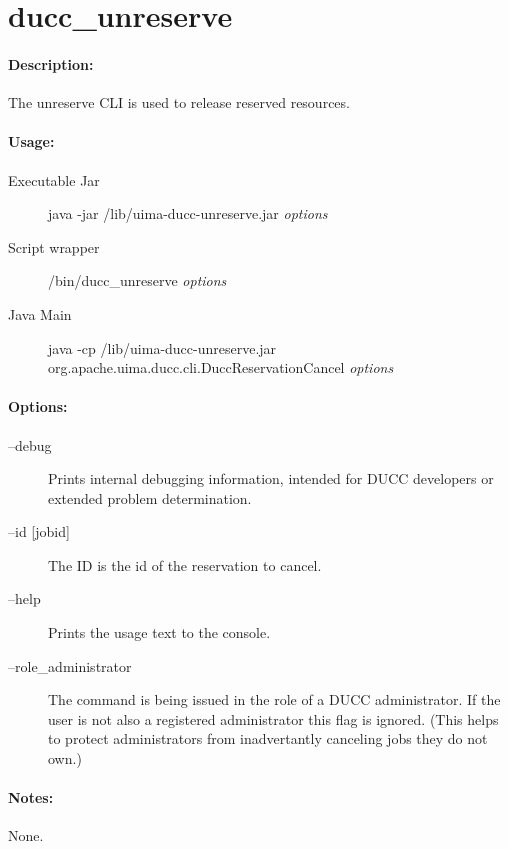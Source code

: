 \ifpdf
\else
{}
\fi
    \section{ducc\_unreserve}
    \label{sec:cli.unreserve}

    \paragraph{Description:}
    The unreserve CLI is used to release reserved resources. 

    \paragraph{Usage:}
    \begin{description}
    \item[Executable Jar] java -jar \ducchome/lib/uima-ducc-unreserve.jar {\em options}
    \item[Script wrapper] \ducchome/bin/ducc\_unreserve {\em options}
    \item[Java Main]      java -cp \ducchome/lib/uima-ducc-unreserve.jar org.apache.uima.ducc.cli.DuccReservationCancel {\em options}
    \end{description}

    \paragraph{Options:}
    \begin{description}
        \item[--debug ]          
          Prints internal debugging information, intended for DUCC developers or extended problem determination.
        \item[--id {[jobid]}]
          The ID is the id of the reservation to cancel.
        \item[--help]
          Prints the usage text to the console. 
        \item[--role\_administrator] The command is being issued in the role of a DUCC administrator.
          If the user is not also a registered administrator this flag is ignored.  (This helps to
          protect administrators from inadvertantly canceling jobs they do not own.)          
     \end{description}
        
    \paragraph{Notes:}
    None.

